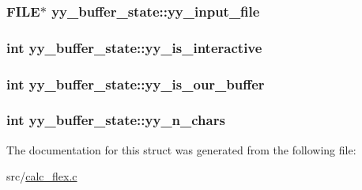 \hypertarget{structyy__buffer__state_a4843d1422e3276b636d475a3095bd948}{
\subsubsection[{yy\+\_\+input\+\_\+file}]{\setlength{\rightskip}{0pt plus 5cm}F\+I\+L\+E$\ast$ yy\+\_\+buffer\+\_\+state\+::yy\+\_\+input\+\_\+file}}\label{structyy__buffer__state_a4843d1422e3276b636d475a3095bd948}
\hypertarget{structyy__buffer__state_abf5c70eea75581b58c0ee7bd31b14490}{
\subsubsection[{yy\+\_\+is\+\_\+interactive}]{\setlength{\rightskip}{0pt plus 5cm}int yy\+\_\+buffer\+\_\+state\+::yy\+\_\+is\+\_\+interactive}}\label{structyy__buffer__state_abf5c70eea75581b58c0ee7bd31b14490}
\hypertarget{structyy__buffer__state_a80ce2431c70dc4f89ced487f18449465}{
\subsubsection[{yy\+\_\+is\+\_\+our\+\_\+buffer}]{\setlength{\rightskip}{0pt plus 5cm}int yy\+\_\+buffer\+\_\+state\+::yy\+\_\+is\+\_\+our\+\_\+buffer}}\label{structyy__buffer__state_a80ce2431c70dc4f89ced487f18449465}
\hypertarget{structyy__buffer__state_a06406208824817acfec2183b79080945}{
\subsubsection[{yy\+\_\+n\+\_\+chars}]{\setlength{\rightskip}{0pt plus 5cm}int yy\+\_\+buffer\+\_\+state\+::yy\+\_\+n\+\_\+chars}}\label{structyy__buffer__state_a06406208824817acfec2183b79080945}


The documentation for this struct was generated from the following file\+:\begin{DoxyCompactItemize}
\item 
src/\hyperlink{calc__flex_8c}{calc\+\_\+flex.\+c}\end{DoxyCompactItemize}
